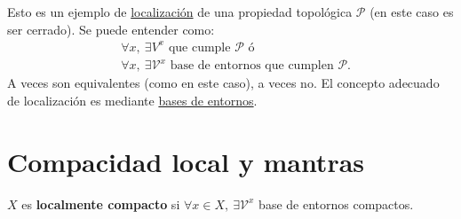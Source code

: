 Esto es un ejemplo de \underline{localización} de una propiedad topológica $\mathcal{P}$ (en este caso es ser cerrado). Se puede entender como:
\begin{align*}
    &\forall x,\ \exists V^x \text{ que cumple } \mathcal{P} \text{ ó } \\
    &\forall x,\ \exists \mathcal{V}^x \text{ base de entornos que cumplen } \mathcal{P} 
.\end{align*}
A veces son equivalentes (como en este caso), a veces no. El concepto adecuado de localización es mediante \underline{bases de entornos}.


\section{Compacidad local y mantras}%
\label{sec:compacidad_local_y_mantras}
\begin{defi}
$X$ es \textbf{localmente compacto} si $\forall x \in X,\ \exists \mathcal{V}^x$ base de entornos compactos.
\end{defi}

